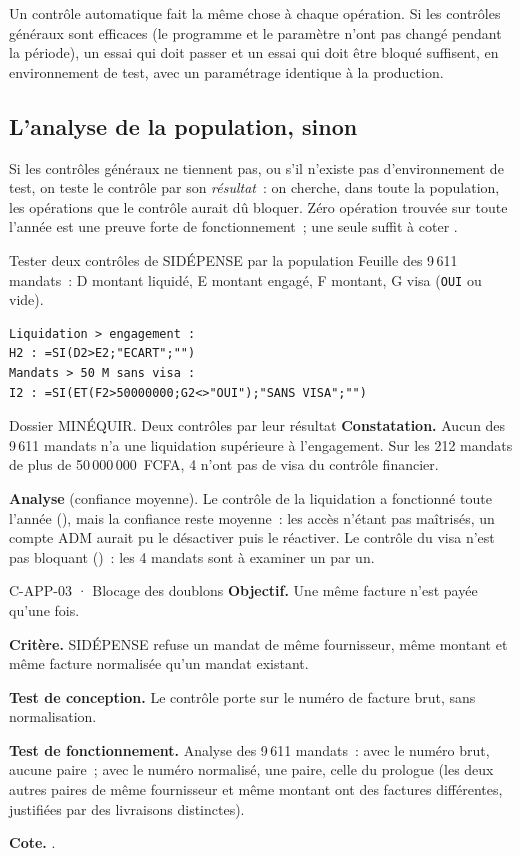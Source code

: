 Un contrôle automatique fait la même chose à chaque opération. Si les
contrôles généraux sont efficaces (le programme et le paramètre n'ont pas
changé pendant la période), un essai qui doit passer et un essai qui doit
être bloqué suffisent, en environnement de test, avec un paramétrage
identique à la production.

\subsection{L'analyse de la population, sinon}

Si les contrôles généraux ne tiennent pas, ou s'il n'existe pas
d'environnement de test, on teste le contrôle par son \emph{résultat}~:
on cherche, dans toute la population, les opérations que le contrôle
aurait dû bloquer. Zéro opération trouvée sur toute l'année est une preuve
forte de fonctionnement~; une seule suffit à coter \NON{}.

\begin{boxoutils}{Tester deux contrôles de SIDÉPENSE par la population}
Feuille des 9\,611 mandats~: D montant liquidé, E montant engagé, F
montant, G visa (\texttt{OUI} ou vide).
\begin{lstlisting}
Liquidation > engagement :
H2 : =SI(D2>E2;"ECART";"")
Mandats > 50 M sans visa :
I2 : =SI(ET(F2>50000000;G2<>"OUI");"SANS VISA";"")
\end{lstlisting}
\end{boxoutils}

\begin{boxscenario}{Dossier MINÉQUIR. Deux contrôles par leur résultat}
\textbf{Constatation.} Aucun des 9\,611 mandats n'a une liquidation
supérieure à l'engagement. Sur les 212 mandats de plus de
50\,000\,000~FCFA, 4 n'ont pas de visa du contrôle financier.

\medskip
\textbf{Analyse} (confiance moyenne). Le contrôle de la liquidation a
fonctionné toute l'année (\OUI{}), mais la confiance reste moyenne~: les
accès n'étant pas maîtrisés, un compte ADM aurait pu le désactiver puis
le réactiver. Le contrôle du visa n'est pas bloquant (\NON{})~: les 4
mandats sont à examiner un par un.
\end{boxscenario}

\begin{boxobjet}{C-APP-03 · Blocage des doublons}
\textbf{Objectif.} Une même facture n'est payée qu'une fois.

\textbf{Critère.} SIDÉPENSE refuse un mandat de même fournisseur, même
montant et même facture normalisée qu'un mandat existant.

\textbf{Test de conception.} Le contrôle porte sur le numéro de facture
brut, sans normalisation.

\textbf{Test de fonctionnement.} Analyse des 9\,611 mandats~: avec le
numéro brut, aucune paire~; avec le numéro normalisé, une paire, celle du
prologue (les deux autres paires de même fournisseur et même montant ont
des factures différentes, justifiées par des livraisons distinctes).

\textbf{Cote.} \NON{}.
\end{boxobjet}

